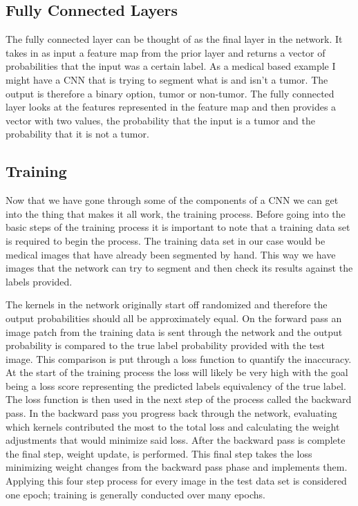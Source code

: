 \documentclass{sig-alternate}
\begin{document}
\subsection{Fully Connected Layers}
\label{sec:fullyConnected}

The fully connected layer can be thought of as the final layer in the network. It takes in as input a feature map from the prior layer and returns a vector of probabilities that the input was a certain label. As a medical based example I might have a CNN that is trying to segment what is and isn't a tumor. The output is therefore a binary option, tumor or non-tumor. The fully connected layer looks at the features represented in the feature map and then provides a vector with two values, the probability that the input is a tumor and the probability that it is not a tumor.

\subsection{Training}
\label{sec:training}

Now that we have gone through some of the components of a CNN we can get into the thing that makes it all work, the training process. Before going into the basic steps of the training process it is important to note that a training data set is required to begin the process. The training data set in our case would be medical images that have already been segmented by hand. This way we have images that the network can try to segment and then check its results against the labels provided.

The kernels in the network originally start off randomized and therefore the output probabilities should all be approximately equal. On the forward pass an image patch from the training data is sent through the network and the output probability is compared to the true label probability provided with the test image. This comparison is put through a loss function to quantify the inaccuracy. At the start of the training process the loss will likely be very high with the goal being a loss score representing the predicted labels equivalency of the true label. The loss function is then used in the next step of the process called the backward pass. In the backward pass you progress back through the network, evaluating which kernels contributed the most to the total loss and calculating the weight adjustments that would minimize said loss. After the backward pass is complete the final step, weight update, is performed. This final step takes the loss minimizing weight changes from the backward pass phase and implements them. Applying this four step process for every image in the test data set is considered one epoch; training is generally conducted over many epochs.
\end{document}
